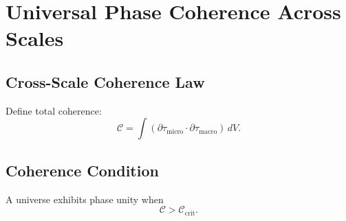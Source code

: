 \chapter{Universal Phase Coherence Across Scales}

\section{Cross-Scale Coherence Law}
Define total coherence:
\[
\mathcal{C} = \int (\partial\tau_{\mathrm{micro}} \cdot \partial\tau_{\mathrm{macro}})\, dV.
\]

\section{Coherence Condition}
A universe exhibits phase unity when
\[
\mathcal{C} > \mathcal{C}_{\mathrm{crit}}.
\]

